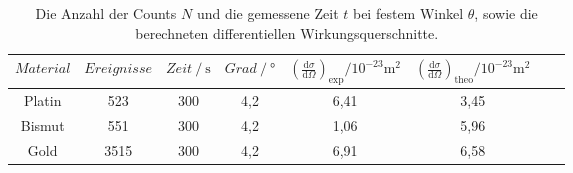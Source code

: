 \begin{table}[H] 
   \centering 
   \caption{Die Anzahl der Counts $N$ und die gemessene Zeit $t$ bei festem
   Winkel $\theta$, sowie die berechneten differentiellen Wirkungsquerschnitte.} 
   \label{tab:zWerte2} 
   \begin{tabular} { c c c c c c c c } 
 \toprule 
 {$Material$}  & {$Ereignisse$} & {$Zeit\:/\: \mathrm{s}$} & {$Grad\:/\: \mathrm{°}$} & {$\left(\frac{\mathrm{d}\sigma}{\mathrm{d}\Omega}\right)_\text{exp}/10^{-23}\si{\meter^2}$} & {$\left(\frac{\mathrm{d}\sigma}{\mathrm{d}\Omega}\right)_\text{theo}/10^{-23}\si{\meter^2}$}\\ 
    \midrule 
    Platin  & 523 & 300 & 4,2 & 6,41 & 3,45 \\ 
    Bismut  & 551 & 300 & 4,2 & 1,06 & 5,96  \\ 
    Gold & 3515 & 300 & 4,2  & 6,91 & 6,58 \\ 
    \bottomrule 
  \end{tabular}
\end{table}